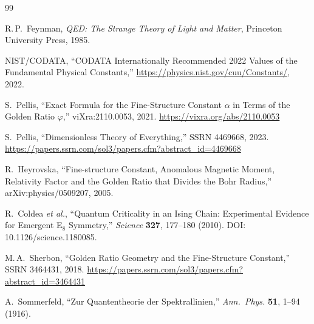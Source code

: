 \documentclass[11pt,a4paper]{article}
\begin{document}
\begin{thebibliography}{99}

R.\,P.~Feynman,
\textit{QED: The Strange Theory of Light and Matter},
Princeton University Press, 1985.

{NIST/CODATA},
``{CODATA Internationally Recommended 2022 Values of the Fundamental Physical Constants},''
\url{https://physics.nist.gov/cuu/Constants/}, 2022.

S.~Pellis,
``Exact Formula for the Fine-Structure Constant $\alpha$ in Terms of the Golden Ratio $\varphi$,''
viXra:2110.0053, 2021.
\url{https://vixra.org/abs/2110.0053}

S.~Pellis,
``Dimensionless Theory of Everything,''
SSRN 4469668, 2023.
\url{https://papers.ssrn.com/sol3/papers.cfm?abstract_id=4469668}

R.~Heyrovska,
``Fine-structure Constant, Anomalous Magnetic Moment, Relativity Factor and the Golden Ratio that Divides the Bohr Radius,''
arXiv:physics/0509207, 2005.

R.~Coldea \textit{et al.},
``Quantum Criticality in an Ising Chain: Experimental Evidence for Emergent E$_{8}$ Symmetry,''
\textit{Science} \textbf{327}, 177--180 (2010).
DOI: 10.1126/science.1180085.

M.\,A.~Sherbon,
``Golden Ratio Geometry and the Fine-Structure Constant,''
SSRN 3464431, 2018.
\url{https://papers.ssrn.com/sol3/papers.cfm?abstract_id=3464431}

A.~Sommerfeld,
``Zur Quantentheorie der Spektrallinien,''
\textit{Ann.\ Phys.} \textbf{51}, 1--94 (1916).

\end{thebibliography}
\end{document}
